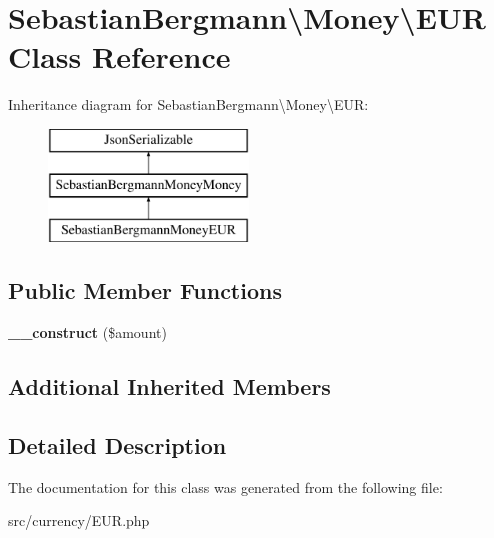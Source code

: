 \hypertarget{classSebastianBergmann_1_1Money_1_1EUR}{}\section{Sebastian\+Bergmann\textbackslash{}Money\textbackslash{}E\+U\+R Class Reference}
\label{classSebastianBergmann_1_1Money_1_1EUR}
Inheritance diagram for Sebastian\+Bergmann\textbackslash{}Money\textbackslash{}E\+U\+R\+:\begin{figure}[H]
\begin{center}
\leavevmode
\includegraphics[height=3.000000cm]{classSebastianBergmann_1_1Money_1_1EUR}
\end{center}
\end{figure}
\subsection*{Public Member Functions}
\begin{DoxyCompactItemize}
\item 
\hypertarget{classSebastianBergmann_1_1Money_1_1EUR_ad5ac0df1f6e2f9ca7a03cd82c0accf90}{}{\bfseries \+\_\+\+\_\+construct} (\$amount)\label{classSebastianBergmann_1_1Money_1_1EUR_ad5ac0df1f6e2f9ca7a03cd82c0accf90}

\end{DoxyCompactItemize}
\subsection*{Additional Inherited Members}


\subsection{Detailed Description}


The documentation for this class was generated from the following file\+:\begin{DoxyCompactItemize}
\item 
src/currency/E\+U\+R.\+php\end{DoxyCompactItemize}
